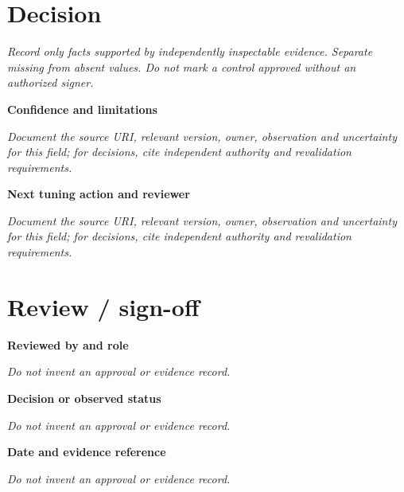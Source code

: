 \documentclass[11pt,letterpaper]{article}
\begin{document}
\section{Decision}
\noindent\emph{Record only facts supported by independently inspectable evidence. Separate missing from absent values. Do not mark a control approved without an authorized signer.}\par
\noindent\textbf{Confidence and limitations}\par
\noindent\emph{Document the source URI, relevant version, owner, observation and uncertainty for this field; for decisions, cite independent authority and revalidation requirements.}\par\medskip
\noindent\textbf{Next tuning action and reviewer}\par
\noindent\emph{Document the source URI, relevant version, owner, observation and uncertainty for this field; for decisions, cite independent authority and revalidation requirements.}\par\medskip
\section{Review / sign-off}
\noindent\textbf{Reviewed by and role}\par
\emph{Do not invent an approval or evidence record.}\par\medskip
\noindent\textbf{Decision or observed status}\par
\emph{Do not invent an approval or evidence record.}\par\medskip
\noindent\textbf{Date and evidence reference}\par
\emph{Do not invent an approval or evidence record.}\par\medskip
\end{document}
